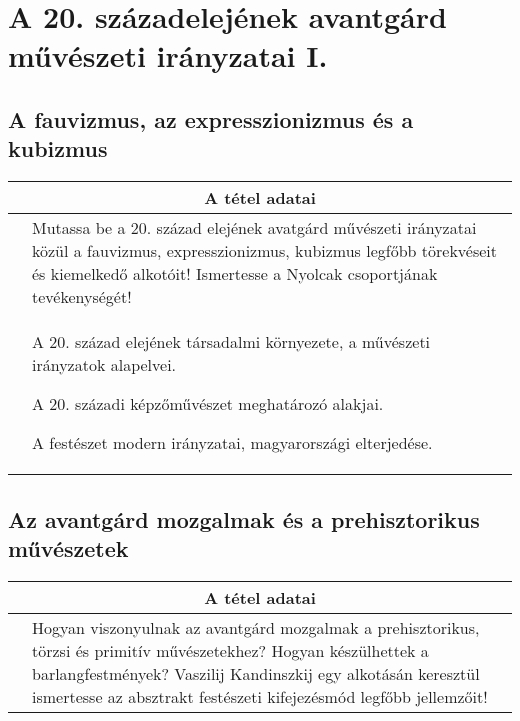 \chapter{A 20. századelejének avantgárd művészeti irányzatai I.} %
\label{ch:16_avantgard_elso_fele}

\section{A fauvizmus, az expresszionizmus és a kubizmus}

\begin{center}
	\begin{longtable}{ | p{} | p{} | }
		
		\hline
		\multicolumn{2}{|c|}{\textbf{A tétel adatai}}
		\\ \hline
		\hline
		
		\centering{Tétel teljes címe}
		&
		Mutassa be a 20. század elejének avatgárd művészeti irányzatai közül a fauvizmus, expresszionizmus, kubizmus legfőbb törekvéseit és kiemelkedő alkotóit! Ismertesse a Nyolcak csoportjának tevékenységét!
		\\ \hline
		
		\centering{Jegyzetek}
		&
		\begin{compactitem}
			\item A 20. század elejének társadalmi környezete, a művészeti irányzatok alapelvei.
			\item A 20. századi képzőművészet meghatározó alakjai.
			\item A festészet modern irányzatai, magyarországi elterjedése.
		\end{compactitem}
		\\\hline
		
	\end{longtable}
\end{center}

\cleardoublepage


\section{Az avantgárd mozgalmak és a prehisztorikus művészetek}

\begin{center}
	\begin{longtable}{ | p{} | p{} | }
		
		\hline
		\multicolumn{2}{|c|}{\textbf{A tétel adatai}}
		\\ \hline		
		\hline
		
		\centering{Tétel teljes címe}
		&
		Hogyan viszonyulnak az avantgárd mozgalmak a prehisztorikus, törzsi és primitív művészetekhez? Hogyan készülhettek a barlangfestmények? Vaszilij Kandinszkij egy alkotásán keresztül ismertesse az absztrakt festészeti kifejezésmód legfőbb jellemzőit!
		\\ \hline
		
	\end{longtable}
\end{center}
